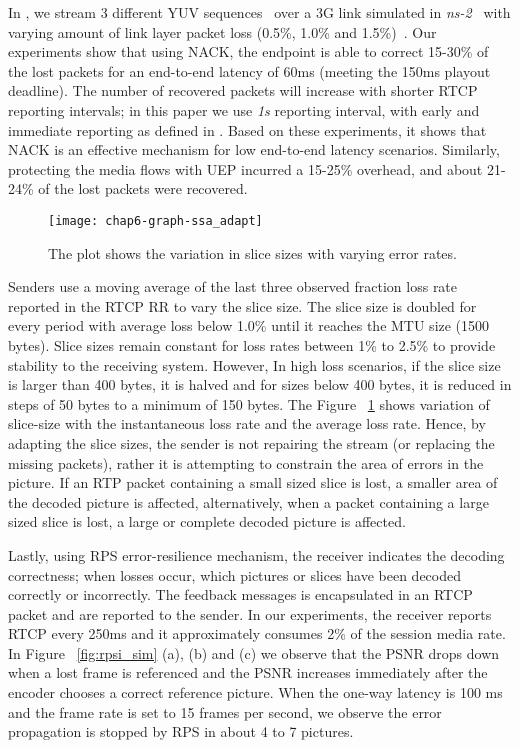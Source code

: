 In , we stream 3 different YUV sequences~\cite{YUV_seq} over a
3G link simulated in \emph{ns-2}~\cite{ns2} with varying amount of link layer
packet loss (0.5\%, 1.0\% and 1.5\%)~\cite{3gppSim}. Our experiments show that
using NACK, the endpoint is able to correct 15-30\% of the lost packets for an
end-to-end latency of 60ms (meeting the 150ms playout deadline). The number of
recovered packets will increase with shorter RTCP reporting intervals; in this
paper we use \emph{1s} reporting interval, with early and immediate reporting
as defined in \cite{rfc4585}. Based on these experiments, it shows that NACK
is an effective mechanism for low end-to-end latency scenarios. Similarly,
protecting the media flows with UEP incurred a 15-25\% overhead, and about
21-24\% of the lost packets were recovered.

\begin{figure}
\centerline {
\texttt{[image: chap6-graph-ssa\_adapt]}
}
\caption{The plot shows the variation in slice sizes with varying error
rates.}
\label{fig:ssa_adapt}
\end{figure}

Senders use a moving average of the last three observed fraction loss rate
reported in the RTCP RR to vary the slice size. The slice size is doubled for
every period with average loss below 1.0\% until it reaches the MTU size
(1500 bytes). Slice sizes remain constant for loss rates between 1\% to 2.5\%
to provide stability to the receiving system. However, In high loss scenarios,
if the slice size is larger than 400 bytes, it is halved and for sizes below
400 bytes, it is reduced in steps of 50 bytes to a minimum of 150 bytes. The
Figure ~\ref{fig:ssa_adapt} shows variation of slice-size with the
instantaneous loss rate and the average loss rate. Hence, by adapting the
slice sizes, the sender is not repairing the stream (or replacing the missing
packets), rather it is attempting to constrain the area of errors in the
picture. If an RTP packet containing a small sized slice is lost, a smaller
area of the decoded picture is affected, alternatively, when a packet
containing a large sized slice is lost, a large or complete decoded picture is
affected.

Lastly, using RPS error-resilience mechanism, the receiver indicates the
decoding correctness; when losses occur, which pictures or slices have been
decoded correctly or incorrectly. The feedback messages is encapsulated in an
RTCP packet and are reported to the sender. In our experiments, the receiver
reports RTCP every 250ms and it approximately consumes 2\% of the session
media rate. In Figure ~\ref{fig:rpsi_sim} (a), (b) and (c) we observe that the
PSNR drops down when a lost frame is referenced and the PSNR increases
immediately after the encoder chooses a correct reference picture. When the
one-way latency is 100 ms and the frame rate is set to 15 frames per second,
we observe the error propagation is stopped by RPS in about 4 to 7 pictures.


